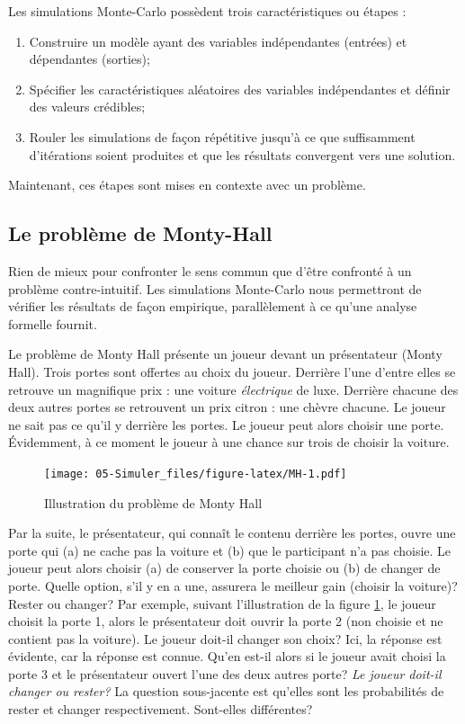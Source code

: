 \documentclass[
]{book}
\begin{document}
Les simulations Monte-Carlo possèdent trois caractéristiques ou étapes :

\begin{enumerate}
\def\labelenumi{\arabic{enumi}.}
\item
  Construire un modèle ayant des variables indépendantes (entrées) et dépendantes (sorties);
\item
  Spécifier les caractéristiques aléatoires des variables indépendantes et définir des valeurs crédibles;
\item
  Rouler les simulations de façon répétitive jusqu'à ce que suffisamment d'itérations soient produites et que les résultats convergent vers une solution.
\end{enumerate}

Maintenant, ces étapes sont mises en contexte avec un problème.

\hypertarget{le-probluxe8me-de-monty-hall}{%
\subsection{Le problème de Monty-Hall}\label{le-probluxe8me-de-monty-hall}}

Rien de mieux pour confronter le sens commun que d'être confronté à un problème contre-intuitif. Les simulations Monte-Carlo nous permettront de vérifier les résultats de façon empirique, parallèlement à ce qu'une analyse formelle fournit.

Le problème de Monty Hall \autocite[attribuables à][]{Selvin75} présente un joueur devant un présentateur (Monty Hall). Trois portes sont offertes au choix du joueur. Derrière l'une d'entre elles se retrouve un magnifique prix : une voiture \emph{électrique} de luxe. Derrière chacune des deux autres portes se retrouvent un prix citron : une chèvre chacune. Le joueur ne sait pas ce qu'il y derrière les portes. Le joueur peut alors choisir une porte. Évidemment, à ce moment le joueur à une chance sur trois de choisir la voiture.

\begin{figure}
\centering
\texttt{[image: 05-Simuler\_files/figure-latex/MH-1.pdf]}
\caption{\label{fig:MH}Illustration du problème de Monty Hall}
\end{figure}

Par la suite, le présentateur, qui connaît le contenu derrière les portes, ouvre une porte qui (a) ne cache pas la voiture et (b) que le participant n'a pas choisie. Le joueur peut alors choisir (a) de conserver la porte choisie ou (b) de changer de porte. Quelle option, s'il y en a une, assurera le meilleur gain (choisir la voiture)? Rester ou changer? Par exemple, suivant l'illustration de la figure \ref{fig:MH}, le joueur choisit la porte 1, alors le présentateur doit ouvrir la porte 2 (non choisie et ne contient pas la voiture). Le joueur doit-il changer son choix? Ici, la réponse est évidente, car la réponse est connue. Qu'en est-il alors si le joueur avait choisi la porte 3 et le présentateur ouvert l'une des deux autres porte? \emph{Le joueur doit-il changer ou rester?} La question sous-jacente est qu'elles sont les probabilités de rester et changer respectivement. Sont-elles différentes?
\end{document}
